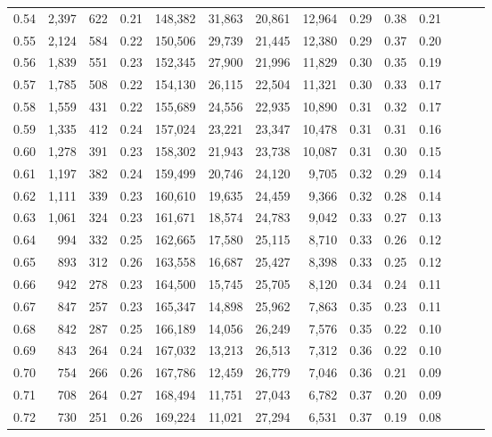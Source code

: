 \begin{tabular}{rrrrrrrrrrrrrr}
0.54 &  2,397 &  622 &  0.21 &  148,382 &   31,863 &  20,861 &  12,964 &  0.29 &  0.38 &      0.21 \\
0.55 &  2,124 &  584 &  0.22 &  150,506 &   29,739 &  21,445 &  12,380 &  0.29 &  0.37 &      0.20 \\
0.56 &  1,839 &  551 &  0.23 &  152,345 &   27,900 &  21,996 &  11,829 &  0.30 &  0.35 &      0.19 \\
0.57 &  1,785 &  508 &  0.22 &  154,130 &   26,115 &  22,504 &  11,321 &  0.30 &  0.33 &      0.17 \\
0.58 &  1,559 &  431 &  0.22 &  155,689 &   24,556 &  22,935 &  10,890 &  0.31 &  0.32 &      0.17 \\
0.59 &  1,335 &  412 &  0.24 &  157,024 &   23,221 &  23,347 &  10,478 &  0.31 &  0.31 &      0.16 \\
0.60 &  1,278 &  391 &  0.23 &  158,302 &   21,943 &  23,738 &  10,087 &  0.31 &  0.30 &      0.15 \\
0.61 &  1,197 &  382 &  0.24 &  159,499 &   20,746 &  24,120 &   9,705 &  0.32 &  0.29 &      0.14 \\
0.62 &  1,111 &  339 &  0.23 &  160,610 &   19,635 &  24,459 &   9,366 &  0.32 &  0.28 &      0.14 \\
0.63 &  1,061 &  324 &  0.23 &  161,671 &   18,574 &  24,783 &   9,042 &  0.33 &  0.27 &      0.13 \\
0.64 &    994 &  332 &  0.25 &  162,665 &   17,580 &  25,115 &   8,710 &  0.33 &  0.26 &      0.12 \\
0.65 &    893 &  312 &  0.26 &  163,558 &   16,687 &  25,427 &   8,398 &  0.33 &  0.25 &      0.12 \\
0.66 &    942 &  278 &  0.23 &  164,500 &   15,745 &  25,705 &   8,120 &  0.34 &  0.24 &      0.11 \\
0.67 &    847 &  257 &  0.23 &  165,347 &   14,898 &  25,962 &   7,863 &  0.35 &  0.23 &      0.11 \\
0.68 &    842 &  287 &  0.25 &  166,189 &   14,056 &  26,249 &   7,576 &  0.35 &  0.22 &      0.10 \\
0.69 &    843 &  264 &  0.24 &  167,032 &   13,213 &  26,513 &   7,312 &  0.36 &  0.22 &      0.10 \\
0.70 &    754 &  266 &  0.26 &  167,786 &   12,459 &  26,779 &   7,046 &  0.36 &  0.21 &      0.09 \\
0.71 &    708 &  264 &  0.27 &  168,494 &   11,751 &  27,043 &   6,782 &  0.37 &  0.20 &      0.09 \\
0.72 &    730 &  251 &  0.26 &  169,224 &   11,021 &  27,294 &   6,531 &  0.37 &  0.19 &      0.08 \\

\end{tabular}
